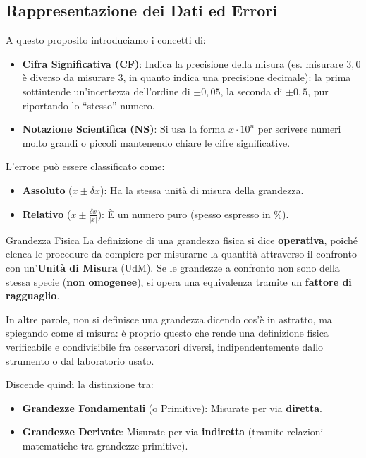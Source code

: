 \subsection{Rappresentazione dei Dati ed Errori}
A questo proposito introduciamo i concetti di:
\begin{itemize}
    \item \textbf{Cifra Significativa (CF)}: Indica la precisione della misura (es. misurare $3,0$ è diverso da misurare $3$, in quanto indica una precisione decimale): la prima sottintende un'incertezza dell'ordine di $\pm 0,05$, la seconda di $\pm 0,5$, pur riportando lo ``stesso'' numero.
    \item \textbf{Notazione Scientifica (NS)}: Si usa la forma $x \cdot 10^n$ per scrivere numeri molto grandi o piccoli mantenendo chiare le cifre significative.
\end{itemize}

L'errore può essere classificato come:
\begin{itemize}
    \item \textbf{Assoluto} ($x \pm \delta x$): Ha la stessa unità di misura della grandezza.
    \item \textbf{Relativo} ($x \pm \frac{\delta x}{|x|}$): È un numero puro (spesso espresso in \%).
\end{itemize}

\begin{definizione}{Grandezza Fisica}
La definizione di una grandezza fisica si dice \textbf{operativa}, poiché elenca le procedure da compiere per misurarne la quantità attraverso il confronto con un'\textbf{Unità di Misura} (UdM). Se le grandezze a confronto non sono della stessa specie (\textbf{non omogenee}), si opera una equivalenza tramite un \textbf{fattore di ragguaglio}.
\end{definizione}
In altre parole, non si definisce una grandezza dicendo cos'è in astratto, ma spiegando come si misura: è proprio questo che rende una definizione fisica verificabile e condivisibile fra osservatori diversi, indipendentemente dallo strumento o dal laboratorio usato.

Discende quindi la distinzione tra:
\begin{itemize}
    \item \textbf{Grandezze Fondamentali} (o Primitive): Misurate per via \textbf{diretta}.
    \item \textbf{Grandezze Derivate}: Misurate per via \textbf{indiretta} (tramite relazioni matematiche tra grandezze primitive).
\end{itemize}

